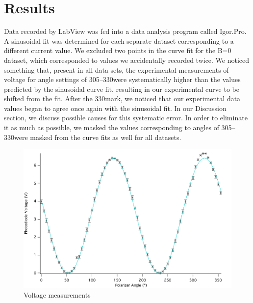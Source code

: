\documentclass[prb,preprint]{revtex4-1}
\begin{document}
\section{Results}
{Data recorded by LabView was fed into a data analysis program called Igor.Pro.  A sinusoidal fit was determined for each separate dataset corresponding to a different current value.  We excluded two points in the curve fit for the B=0 dataset, which corresponded to values we accidentally recorded twice. 
We noticed something that, present in all data sets, the experimental measurements of voltage for angle settings of 305\degree--330\degree were systematically higher than the values predicted by the sinusoidal curve fit, resulting in our experimental curve to be shifted from the fit.  After the 330\degree mark, we noticed that our experimental data values began to agree once again with the sinusoidal fit.  In our Discussion section, we discuss possible causes for this systematic error.  In order to eliminate it as much as possible, we masked the values corresponding to angles of 305\degree--330\degree were masked from the curve fits as well for all datasets.
\begin{figure}
\includegraphics[width = 6.3in]{0A.pdf}
\caption{\label{nofield}Voltage measurements }

\end{figure}

}
\end{document}
